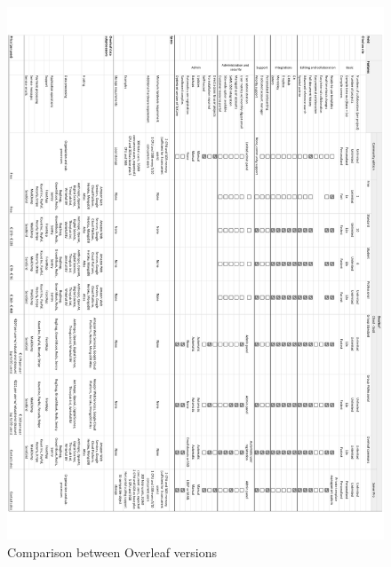\begin{figure}[ht]
    \centering
    \includegraphics[width=1\linewidth]{attachments/overleaf_overview.pdf}
    \caption{Comparison between Overleaf versions}
    \label{fig:A2_attach_overleaf_overview}
\end{figure}

\newpage




